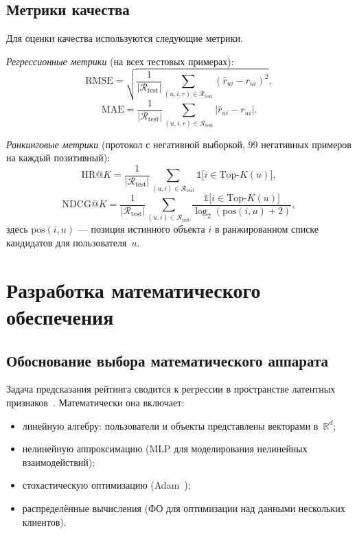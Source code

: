 \documentclass[14pt,a4paper]{extarticle}
\begin{document}
\subsection{Метрики качества}

Для оценки качества используются следующие метрики.

\textit{Регрессионные метрики} (на всех тестовых примерах):
\begin{equation}
\text{RMSE} = \sqrt{\frac{1}{|\mathcal{R}_{\text{test}}|}\sum_{(u,i,r)\in\mathcal{R}_{\text{test}}}(\hat{r}_{ui} - r_{ui})^2},
\end{equation}
\begin{equation}
\text{MAE} = \frac{1}{|\mathcal{R}_{\text{test}}|}\sum_{(u,i,r)\in\mathcal{R}_{\text{test}}}|\hat{r}_{ui} - r_{ui}|.
\end{equation}

\textit{Ранкинговые метрики} (протокол с негативной выборкой, 99 негативных примеров на каждый позитивный):
\begin{equation}
\text{HR@}K = \frac{1}{|\mathcal{R}_{\text{test}}|}\sum_{(u,i)\in\mathcal{R}_{\text{test}}} \mathbb{1}\bigl[i \in \text{Top-}K(u)\bigr],
\end{equation}
\begin{equation}
\text{NDCG@}K = \frac{1}{|\mathcal{R}_{\text{test}}|}\sum_{(u,i)\in\mathcal{R}_{\text{test}}} \frac{\mathbb{1}\bigl[i \in \text{Top-}K(u)\bigr]}{\log_2(\text{pos}(i, u) + 2)},
\end{equation}
здесь $\text{pos}(i, u)$ --- позиция истинного объекта $i$ в ранжированном списке кандидатов для пользователя~$u$.

\newpage


\section{Разработка математического обеспечения}

\subsection{Обоснование выбора математического аппарата}

Задача предсказания рейтинга сводится к регрессии в пространстве латентных признаков~\cite{vorontsov2020ml}. Математически она включает:
\begin{itemize}
  \item линейную алгебру: пользователи и объекты представлены векторами в~$\mathbb{R}^d$;
  \item нелинейную аппроксимацию (MLP для моделирования нелинейных взаимодействий);
  \item стохастическую оптимизацию (Adam~\cite{kingma2015adam});
  \item распределённые вычисления (ФО для оптимизации над данными нескольких клиентов).
\end{itemize}
\end{document}
